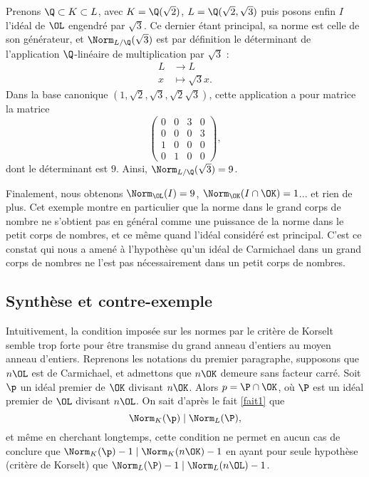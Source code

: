 \documentclass[a4paper, 12pt, oneside]{article}
\begin{document}
\begin{exemple}
	Prenons $\Q \subset K \subset L$, avec $ K =\Q(\sqrt{2})$, $L = \Q(\sqrt{2}, \sqrt{3})$ puis posons enfin $I$ l'idéal de $\OL$ engendré par $\sqrt{3}$. Ce dernier étant principal, sa norme est celle de son générateur, et $\Norm_{L/\Q}(\sqrt{3})$ est par définition le déterminant de l'application $\Q$-linéaire de multiplication par $\sqrt{3}$ : \begin{align*} L &\to L \\ x &\mapsto \sqrt{3} x.\end{align*} Dans la base canonique $(1, \sqrt{2}, \sqrt{3}, \sqrt{2}\sqrt{3})$, cette application a pour matrice la matrice $$\begin{pmatrix} 0 & 0 & 3 & 0 \\ 0 & 0 & 0 & 3 \\ 1 & 0 & 0 & 0 \\ 0 & 1 & 0 & 0\end{pmatrix},$$ dont le déterminant est $9$. Ainsi, $\Norm_{L/\Q}(\sqrt{3}) = 9$. 

Finalement, nous obtenons $\Norm_{\OL}(I) = 9$, $\Norm_{\OK}(I\cap \OK)=1$... et rien de plus. Cet exemple montre en particulier que la norme dans le grand corps de nombre ne s'obtient pas en général comme une puissance de la norme dans le petit corps de nombres, et ce même quand l'idéal considéré est principal. C'est ce constat qui nous a amené à l'hypothèse qu'un idéal de Carmichael dans un grand corps de nombres ne l'est pas nécessairement dans un petit corps de nombres.
\end{exemple}

\subsection{Synthèse et contre-exemple}

Intuitivement, la condition imposée sur les normes par le critère de Korselt semble trop forte pour être transmise du grand anneau d'entiers au moyen anneau d'entiers. Reprenons les notations du premier paragraphe, supposons que $n\OL$ est de Carmichael, et admettons que $n\OK$ demeure sans facteur carré. Soit $\p$ un idéal premier de $\OK$ divisant $n\OK$. Alors $p=\P\cap \OK$, où $\P$ est un idéal premier de $\OL$ divisant $n\OL$. On sait d'après le fait \ref{fait1} que $$\Norm_K(\p) \mid \Norm_L(\P),$$ et même en cherchant longtemps, cette condition ne permet en aucun cas de conclure que $\Norm_K(\p) - 1\mid \Norm_K(n\OK) - 1$ en ayant pour seule hypothèse (critère de Korselt) que $\Norm_L(\P) - 1 \mid \Norm_L(n\OL) - 1$. \\
\end{document}

